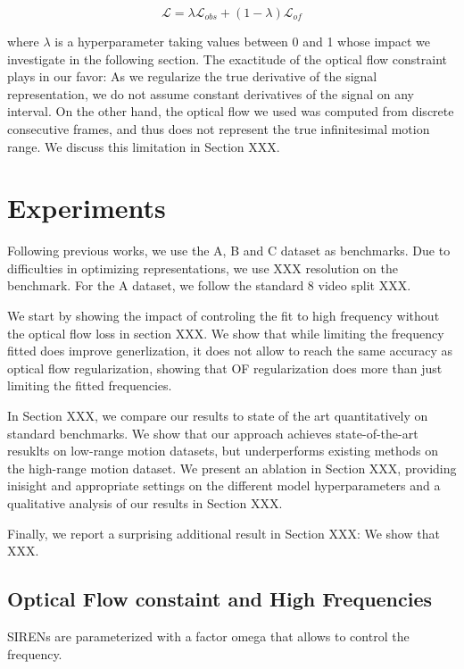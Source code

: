 \documentclass{article}
\begin{document}
\begin{equation}
\mathcal{L} = \lambda \mathcal{L}_{obs} + (1-\lambda) \mathcal{L}_{of}
\end{equation}

where $\lambda$ is a hyperparameter taking values between 0 and 1 whose impact we investigate in the following section.
The exactitude of the optical flow constraint plays in our favor:
As we regularize the true derivative of the signal representation, we do not assume constant derivatives of the signal on any interval.
On the other hand, the optical flow we used was computed from discrete consecutive frames, 
and thus does not represent the true infinitesimal motion range.
We discuss this limitation in Section XXX.

\section{Experiments}

Following previous works, we use the A, B and C dataset as benchmarks.
Due to difficulties in optimizing representations, we use XXX resolution on the benchmark.
For the A dataset, we follow the standard 8 video split XXX.

We start by showing the impact of controling the fit to high frequency without the optical flow loss in section XXX.
We show that while limiting the frequency fitted does improve generlization, it does not allow to reach 
the same accuracy as optical flow regularization, showing that OF regularization does more than just limiting the fitted frequencies.

In Section XXX, we compare our results to state of the art quantitatively on standard benchmarks.
We show that our approach achieves state-of-the-art resuklts on low-range motion datasets, but underperforms existing methods on the high-range motion dataset.
We present an ablation in Section XXX, providing inisight and appropriate settings on the different model hyperparameters and a qualitative analysis of our results in Section XXX.

Finally, we report a surprising additional result in Section XXX:
We show that XXX.


\subsection{Optical Flow constaint and High Frequencies}

SIRENs are parameterized with a factor omega that allows to control the frequency.
\end{document}

